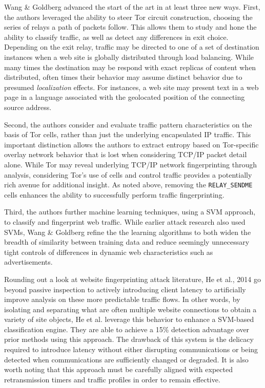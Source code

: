 \documentclass[sigconf]{acmart}
\begin{document}
Wang \& Goldberg advanced the start of the art in at least three new
ways.  First, the authors leveraged the ability to steer Tor circuit
construction, choosing the series of relays a path of packets follow.
This allows them to study and hone the ability to classify traffic, as
well as detect any differences in exit choice.  Depending on the exit
relay, traffic may be directed to one of a set of destination instances
when a web site is globally distributed through load balancing.  While
many times the destination may be respond with exact replicas of content
when distributed, often times their behavior may assume distinct
behavior due to presumed \emph{localization} effects.  For instances, a
web site may present text in a web page in a language associated with
the geolocated position of the connecting source address.

Second, the authors consider and evaluate traffic pattern
characteristics on the basis of Tor cells, rather than just the
underlying encapsulated IP traffic.  This important distinction allows
the authors to extract entropy based on Tor-specific overlay network
behavior that is lost when considering TCP/IP packet detail alone.
While Tor may reveal underlying TCP/IP network fingerprinting through
analysis, considering Tor's use of cells and control traffic provides a
potentially rich avenue for additional insight.  As noted above,
removing the \texttt{RELAY\_SENDME} cells enhances the ability to
successfully perform traffic fingerprinting.

Third, the authors further machine learning techniques, using a SVM
approach, to classify and fingerprint web traffic.  While earlier attack
research also used SVMs, Wang \& Goldberg refine the the learning
algorithms to both widen the breadth of similarity between training data
and reduce seemingly unnecessary tight controls of differences in
dynamic web characteristics such as advertisements.

Rounding out a look at website fingerprinting attack literature, He et
al., 2014 \cite{he_novel_2014} go beyond passive inspection to actively
introducing client latency to artificially improve analysis on these
more predictable traffic flows.  In other words, by isolating and
separating what are often multiple website connections to obtain a
variety of site objects, He et al. leverage this behavior to enhance a
SVM-based classification engine.  They are able to achieve a 15\%
detection advantage over prior methods using this approach.  The
drawback of this system is the delicacy required to introduce latency
without either disrupting communications or being detected when
communications are sufficiently changed or degraded.  It is also worth
noting that this approach must be carefully aligned with expected
retransmission timers and traffic profiles in order to remain effective.
\end{document}
